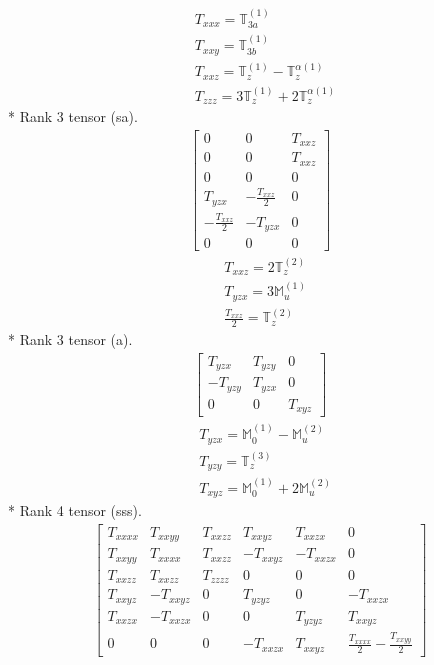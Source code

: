 \documentclass[fleqn,8pt,landscape]{jsarticle}
\begin{document}
\begin{align*}
& T_{xxx} = \mathbb{T}_{3a}^{(1)} \\
& T_{xxy} = \mathbb{T}_{3b}^{(1)} \\
& T_{xxz} = \mathbb{T}_{z}^{(1)} - \mathbb{T}_{z}^{\alpha(1)} \\
& T_{zzz} = 3 \mathbb{T}_{z}^{(1)} + 2 \mathbb{T}_{z}^{\alpha(1)}
\end{align*}
* Rank 3 tensor (sa).
\begin{align*}
\begin{bmatrix} 0 & 0 & T_{xxz} \\ 0 & 0 & T_{xxz} \\ 0 & 0 & 0 \\ T_{yzx} & - \frac{T_{xxz}}{2} & 0 \\ - \frac{T_{xxz}}{2} & - T_{yzx} & 0 \\ 0 & 0 & 0 \end{bmatrix}
\end{align*}
\begin{align*}
& T_{xxz} = 2 \mathbb{T}_{z}^{(2)} \\
& T_{yzx} = 3 \mathbb{M}_{u}^{(1)} \\
& \frac{T_{xxz}}{2} = \mathbb{T}_{z}^{(2)}
\end{align*}
* Rank 3 tensor (a).
\begin{align*}
\begin{bmatrix} T_{yzx} & T_{yzy} & 0 \\ - T_{yzy} & T_{yzx} & 0 \\ 0 & 0 & T_{xyz} \end{bmatrix}
\end{align*}
\begin{align*}
& T_{yzx} = \mathbb{M}_{0}^{(1)} - \mathbb{M}_{u}^{(2)} \\
& T_{yzy} = \mathbb{T}_{z}^{(3)} \\
& T_{xyz} = \mathbb{M}_{0}^{(1)} + 2 \mathbb{M}_{u}^{(2)}
\end{align*}
* Rank 4 tensor (sss).
\begin{align*}
\begin{bmatrix} T_{xxxx} & T_{xxyy} & T_{xxzz} & T_{xxyz} & T_{xxzx} & 0 \\ T_{xxyy} & T_{xxxx} & T_{xxzz} & - T_{xxyz} & - T_{xxzx} & 0 \\ T_{xxzz} & T_{xxzz} & T_{zzzz} & 0 & 0 & 0 \\ T_{xxyz} & - T_{xxyz} & 0 & T_{yzyz} & 0 & - T_{xxzx} \\ T_{xxzx} & - T_{xxzx} & 0 & 0 & T_{yzyz} & T_{xxyz} \\ 0 & 0 & 0 & - T_{xxzx} & T_{xxyz} & \frac{T_{xxxx}}{2} - \frac{T_{xxyy}}{2} \end{bmatrix}
\end{align*}
\end{document}
